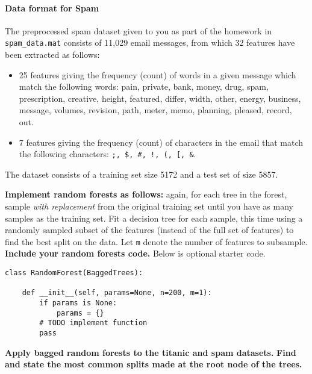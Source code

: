 \documentclass[preview]{standalone}
\begin{document}
\begin{Parts}
\paragraph{Data format for Spam}

The preprocessed spam dataset given to you as part of the homework in \texttt{spam\_data.mat} consists of 11,029 email messages, from which 32 features have been extracted as follows:
\begin{itemize}
\item 25 features giving the frequency (count) of words in a given message which match the following words: pain, private, bank, money, drug, spam, prescription, creative, height, featured, differ, width, other, energy, business, message, volumes, revision, path, meter, memo, planning, pleased, record, out.

\item 7 features giving the frequency (count) of characters in the email that match the following characters: \texttt{;, \$, \#, !, (, [, \&}.
\end{itemize}

The dataset consists of a training set size 5172 and a test set of size 5857.



\Part \textbf{Implement random forests as follows:} again, for each tree in the forest, sample \textit{with replacement} from the original training set until you have as many samples as the training set. Fit a decision tree for each sample, this time using a randomly sampled subset of the features (instead of the full set of features) to find the best split on the data. Let \texttt{m} denote the number of features to subsample. \textbf{Include your random forests code.} Below is optional starter code.

\begin{verbatim}
class RandomForest(BaggedTrees):

    def __init__(self, params=None, n=200, m=1):
        if params is None:
            params = {}
        # TODO implement function
        pass
\end{verbatim}



\Part \textbf{Apply bagged random forests to the titanic and spam datasets.} \textbf{Find and state the most common splits made at the root node of the trees.}




\end{Parts}
\end{document}
